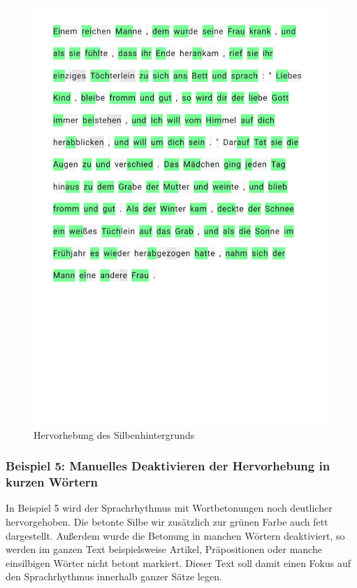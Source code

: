 \begin{figure}[h!]
	\centering
	\includegraphics[width=.7\linewidth, frame]{figures/evaluation/annotation4}
	\caption{Hervorhebung des Silbenhintergrunds}
	\label{fig:evaluation-ex4}
\end{figure}
\newpage

\subsubsection{Beispiel 5: Manuelles Deaktivieren der Hervorhebung in kurzen Wörtern}

In Beispiel 5 wird der Sprachrhythmus mit Wortbetonungen noch deutlicher hervorgehoben. Die betonte Silbe wir zusätzlich zur grünen Farbe auch fett dargestellt. Außerdem wurde die Betonung in manchen Wörtern deaktiviert, so werden im ganzen Text beispielsweise Artikel, Präpositionen oder manche einsilbigen Wörter nicht betont markiert. Dieser Text soll damit einen Fokus auf den Sprachrhythmus innerhalb ganzer Sätze legen.

